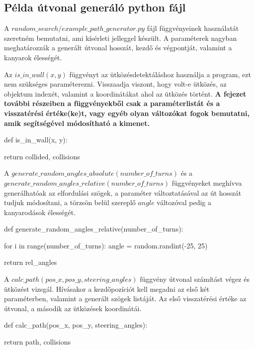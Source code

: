 

\subsection{Példa útvonal generáló python fájl}

A $random\_search/example\_path\_generator.py$ fájl függvényeinek használatát szeretném bemutatni, ami kísérleti jelleggel készült. A paraméterek nagyban meghatározzák a generált útvonal hosszát, kezdő és végpontját, valamint a kanyarok élességét. 

Az $is\_in\_wall(x, y)$ függvényt az ütközésdetektáláshoz használja a program, ezt nem szükséges paraméterezni. Visszaadja viszont, hogy volt-e ütközés, az objektum indexét, valamint a koordinátákat ahol az ütközés történt. \textbf{A fejezet további részeiben a függvényekből csak a paraméterlistát és a visszatérési értéke(ke)t, vagy egyéb olyan változókat fogok bemutatni, amik segítségével módosítható a kimenet.}

\begin{python}
def is_in_wall(x, y):

	return collided, collisions
\end{python}

A $ generate\_random\_angles\_absolute(number\_of\_turns) $ és a\\ $ generate\_random\_angles\_relative(number\_of\_turns) $ függvényeket meghívva generálhatóak az elfordulási szögek, a paraméter változtatásával az út hosszát tudjuk módosítani, a törzsön belül szereplő $ angle $ változóval pedig a kanyarodások élességét.

\begin{python}
def generate_random_angles_relative(number_of_turns):

	for i in range(number_of_turns):
        	angle = random.randint(-25, 25)
        
    return rel_angles
\end{python}

A $ calc\_path(pos\_x, pos\_y, steering\_angles) $ függvény útvonal számítást végez és ütközést vizsgál. Hívásakor a kezdőpozíciót kell megadni az első két paraméterben, valamint a generált szögek listáját. Az első visszatérési értéke az útvonal, a második az ütközések koordinátái.

\begin{python}
def calc_path(pos_x, pos_y, steering_angles):

	return path, collisions
\end{python}

